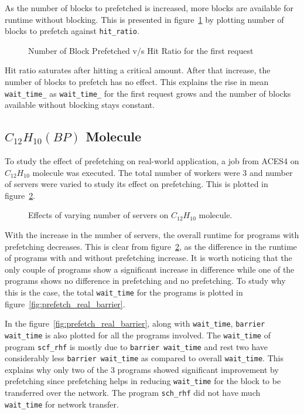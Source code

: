 As the number of blocks to prefetched is increased, more blocks are available for
runtime without blocking. This is presented in figure~\ref{fig:look_ahead_hit_ratio}
by plotting number of blocks to prefetch against \texttt{hit\_ratio}.

\begin{figure}[h]
  
  \caption{Number of Block Prefetched v/s Hit Ratio for the first request}
  \label{fig:look_ahead_hit_ratio}
\end{figure}

Hit ratio saturates after hitting a critical amount. After that increase, the number
of blocks to prefetch has no effect. This explains the rise in mean
\texttt{wait\_time\_} as \texttt{wait\_time\_} for the first request grows and the
number of blocks available without blocking stays constant.

\subsection{$C_{12}H_{10}(BP)$ Molecule}\label{sec:bp_molecule}
To study the effect of prefetching on real-world application, a job from ACES4 on
$C_{12}H_{10}$ molecule was executed. The total number of workers were 3 and number
of servers were varied to study its effect on prefetching. This is plotted in
figure~\ref{fig:prefetch_real}.

\begin{figure}[h]
  
  \caption{Effects of varying number of servers on $C_{12}H_{10}$ molecule.}
  \label{fig:prefetch_real}
\end{figure}

With the increase in the number of servers, the overall runtime for programs with
prefetching decreases. This is clear from figure~\ref{fig:prefetch_real}, as the difference
in the runtime of programs with and without prefetching increase. It is worth noticing
that the only couple of programs show a significant increase in difference while one
of the programs shows no difference in prefetching and no prefetching. To study
why this is the case, the total \texttt{wait\_time} for the programs is plotted in
figure~\ref{fig:prefetch_real_barrier}.

In the figure~\ref{fig:prefetch_real_barrier}, along with \texttt{wait\_time},
\texttt{barrier wait\_time} is also plotted for all the programs involved. The
\texttt{wait\_time} of program \texttt{scf\_rhf} is mostly due to \texttt{barrier wait\_time}
and rest two have considerably less \texttt{barrier wait\_time} as compared to
overall \texttt{wait\_time}. This explains why only two of the 3 programs showed
significant improvement by prefetching since prefetching helps in reducing \texttt{wait\_time}
for the block to be transferred over the network. The program \texttt{sch\_rhf} did not
have much \texttt{wait\_time} for network transfer.

